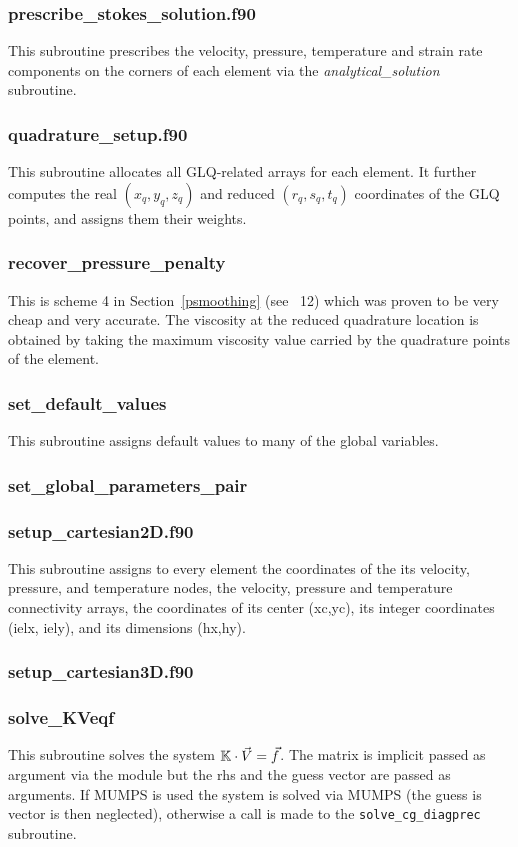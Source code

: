  \subsubsection{prescribe\_stokes\_solution.f90}
 This subroutine prescribes the velocity, pressure, temperature and strain rate components
 on the corners of each element via the {\sl analytical\_solution} subroutine.
 \subsubsection{quadrature\_setup.f90}
 This subroutine allocates all GLQ-related arrays for each element.
 It further computes the real $(x_q,y_q,z_q)$ and reduced $(r_q,s_q,t_q)$
 coordinates of the GLQ points, and assigns them their weights.
 \subsubsection{recover\_pressure\_penalty}
 This is scheme 4 in Section~\ref{psmoothing} (see \stone~12) which was proven to be 
 very cheap and very accurate. 
 The viscosity at the reduced quadrature location 
 is obtained by taking the maximum viscosity value carried by the quadrature points of 
 the element. 
 \subsubsection{set\_default\_values}
 This subroutine assigns default values to many of the global variables.
 \subsubsection{set\_global\_parameters\_pair}

 \subsubsection{setup\_cartesian2D.f90}
 This subroutine assigns to every element the coordinates of the its velocity, pressure,
 and temperature nodes, the velocity, pressure and temperature connectivity arrays,
 the coordinates of its center (xc,yc), its integer coordinates (ielx, iely),
 and its dimensions (hx,hy).
 \subsubsection{setup\_cartesian3D.f90}
 
 \subsubsection{solve\_KVeqf}
 This subroutine solves the system ${\mathbb{K}}\cdot \vec{V} = \vec{f}$. The matrix is 
 implicit passed as argument via the module but the rhs and the guess vector are 
 passed as arguments.
 If MUMPS is used the system is solved via MUMPS (the guess is vector
 is then neglected), otherwise a call is made to  the {\tt solve\_cg\_diagprec} subroutine.
